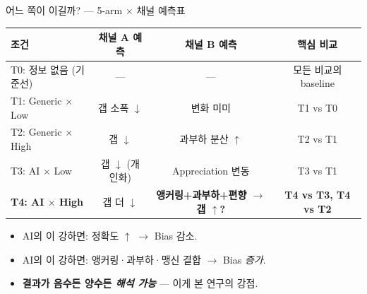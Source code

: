 \documentclass[aspectratio=169]{beamer}
\begin{document}
\begin{frame}{어느 쪽이 이길까? --- 5-arm $\times$ 채널 예측표}
  \small
  \begin{tabular}{lccc}
    \hline
    \textbf{조건} & \textbf{채널 A 예측} & \textbf{채널 B 예측} & \textbf{핵심 비교} \\
    \hline
    T0: 정보 없음 (기준선) & --- & --- & 모든 비교의 baseline \\
    T1: Generic $\times$ Low & 갭 소폭 $\downarrow$ & 변화 미미 & T1 vs T0 \\
    T2: Generic $\times$ High & 갭 $\downarrow$ & 과부하 분산 $\uparrow$ & T2 vs T1 \\
    T3: AI $\times$ Low & 갭 $\downarrow$ (개인화) & Appreciation 변동 & T3 vs T1 \\
    \textbf{T4: AI $\times$ High} & 갭 더 $\downarrow$ & \textbf{앵커링+과부하+편향 $\rightarrow$ 갭 $\uparrow$?} & \textbf{T4 vs T3, T4 vs T2} \\
    \hline
  \end{tabular}

  \vspace{0.7em}
  \begin{itemize}\itemsep0.1em
    \item AI의 이 강하면: 정확도 $\uparrow$ $\rightarrow$ Bias 감소.
    \item AI의 이 강하면: 앵커링·과부하·맹신 결합 $\rightarrow$ Bias \emph{증가}.
    \item \textbf{결과가 음수든 양수든 \emph{해석 가능}} --- 이게 본 연구의 강점.
  \end{itemize}
\end{frame}

\end{document}
